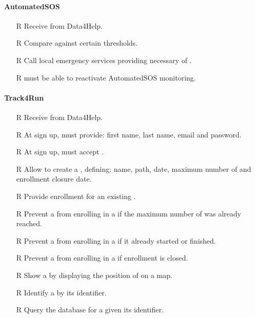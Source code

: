 \documentclass[../../../rasd.tex]{subfiles}
\begin{document}
        \paragraph{AutomatedSOS}
        \begin{itemize}
            \item[R\subs{36}]Receive  from Data4Help.
            \item[R\subs{37}]Compare  against certain thresholds.
            \item[R\subs{38}]Call local emergency services providing necessary  of .
            \item[R\subs{39}] must be able to reactivate AutomatedSOS monitoring.
        \end{itemize}

        \paragraph{Track4Run}
        \begin{itemize}
            \item[R\subs{40}]Receive  from Data4Help.
            \item[R\subs{41}]At sign up,  must provide: first name, last name, email and password.
            \item[R\subs{42}]At sign up,  must accept .
            \item[R\subs{43}]Allow  to create a , defining: name, path, date, maximum number of  and enrollment closure date. 
            \item[R\subs{44}]Provide  enrollment for an existing .
            \item[R\subs{45}]Prevent a  from enrolling in a  if the maximum number of  was already reached.
            \item[R\subs{46}]Prevent a  from enrolling in a  if it already started or finished.
            \item[R\subs{47}]Prevent a  from enrolling in a  if enrollment is closed.
            \item[R\subs{48}]Show a  by displaying the position of  on a map.
            \item[R\subs{49}]Identify a  by its identifier.
            \item[R\subs{50}]Query the database for a  given its identifier.
        \end{itemize}
\end{document}
